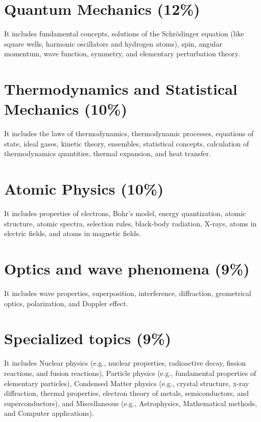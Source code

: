 \documentclass[12pt,a4paper]{article}
\begin{document}
\section{Quantum Mechanics (12\%)}

It includes fundamental concepts, solutions of the Schr\"{o}dinger equation (like square wells, harmonic oscillators and hydrogen atoms), spin, angular momentum, wave function, symmetry, and elementary perturbation theory.


\section{Thermodynamics and Statistical Mechanics (10\%)}

It includes the laws of thermodynamics, thermodynamic processes, equations of state, ideal gases, kinetic theory, ensembles, statistical concepts, calculation of thermodynamics quantities, thermal expansion, and heat transfer.


\section{Atomic Physics (10\%)}

It includes properties of electrons, Bohr's model, energy quantization, atomic structure, atomic spectra, selection rules, black-body radiation, X-rays, atoms in electric fields, and atoms in magnetic fields.


\section{Optics and wave phenomena (9\%)}

It includes wave properties, superposition, interference, diffraction, geometrical optics, polarization, and Doppler effect.


\section{Specialized topics (9\%)}

It includes Nuclear physics (e.g., nuclear properties, radioactive decay, fission reactions, and fusion reactions), Particle physics (e.g., fundamental properties of elementary particles), Condensed Matter physics (e.g., crystal structure, x-ray diffraction, thermal properties, electron theory of metals, semiconductors, and superconductors), and Miscellaneous (e.g., Astrophysics, Mathematical methods, and Computer applications). 
\end{document}
